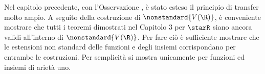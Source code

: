 
Nel capitolo precedente, con l'Osservazione , è stato esteso il principio di transfer molto ampio. A seguito della costruzione di $ \nonstandard{V(\R)} $, è conveniente mostrare che tutti i teoremi dimostrati nel Capitolo 3 per $ \starR $ siano ancora validi all'interno di $ \nonstandard{V(\R)} $. Per fare ciò è sufficiente mostrare che le estensioni non standard delle funzioni e degli insiemi corrispondano per entrambe le costruzioni. Per semplicità si mostra unicamente per funzioni ed insiemi di arietà uno.


